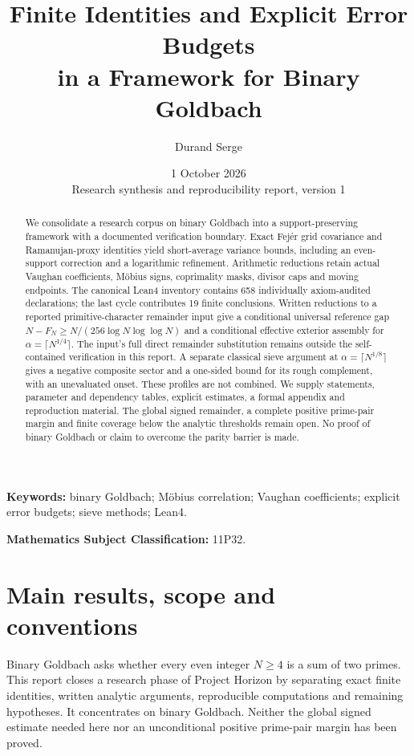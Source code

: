 \documentclass[11pt,a4paper]{article}
\title{Finite Identities and Explicit Error Budgets\\
in a Framework for Binary Goldbach}
\author{Durand Serge}
\date{1 October 2026\\[4pt]\small Research synthesis and reproducibility report, version 1}
\theoremstyle{definition}
\theoremstyle{remark}
\begin{document}
\maketitle
\begin{abstract}
We consolidate a research corpus on binary Goldbach into a support-preserving framework with a documented verification boundary. Exact Fej\'er grid covariance and Ramanujan-proxy identities yield short-average variance bounds, including an even-support correction and a logarithmic refinement. Arithmetic reductions retain actual Vaughan coefficients, M\"obius signs, coprimality masks, divisor caps and moving endpoints. The canonical Lean4 inventory contains 658 individually axiom-audited declarations; the last cycle contributes 19 finite conclusions. Written reductions to a reported primitive-character remainder input give a conditional universal reference gap $N-F_N\ge N/(256\log N\log\log N)$ and a conditional effective exterior assembly for $\alpha=\lceil N^{1/4}\rceil$. The input's full direct remainder substitution remains outside the self-contained verification in this report. A separate classical sieve argument at $\alpha=\lceil N^{1/8}\rceil$ gives a negative composite sector and a one-sided bound for its rough complement, with an unevaluated onset. These profiles are not combined. We supply statements, parameter and dependency tables, explicit estimates, a formal appendix and reproduction material. The global signed remainder, a complete positive prime-pair margin and finite coverage below the analytic thresholds remain open. No proof of binary Goldbach or claim to overcome the parity barrier is made.
\end{abstract}
\noindent\textbf{Keywords:} binary Goldbach; M\"obius correlation; Vaughan coefficients; explicit error budgets; sieve methods; Lean4.
\par\noindent\textbf{Mathematics Subject Classification:} 11P32.
\clearpage
\tableofcontents
\clearpage


\section{Main results, scope and conventions}\label{sec:scope}
Binary Goldbach asks whether every even integer $N\ge4$ is a sum of two primes. This report closes a research phase of Project Horizon by separating exact finite identities, written analytic arguments, reproducible computations and remaining hypotheses. It concentrates on binary Goldbach. Neither the global signed estimate needed here nor an unconditional positive prime-pair margin has been proved.
\end{document}
